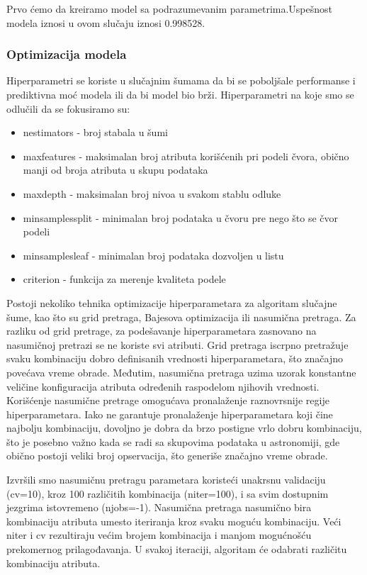 \documentclass[a4paper,12pt]{article}
\begin{document}
Prvo ćemo da kreiramo model sa podrazumevanim parametrima.Uspešnost modela iznosi u ovom slučaju iznosi 0.998528.

\subsubsection{Optimizacija modela}
Hiperparametri se koriste u slučajnim šumama da bi se poboljšale performanse i prediktivna moć modela ili da bi model bio brži.
Hiperparametri na koje smo se odlučili da se fokusiramo su:
\begin{itemize}
    \item n\textunderscore estimators - broj stabala u šumi
    \item max\textunderscore features - maksimalan broj atributa korišćenih pri podeli čvora, obično manji od broja atributa u skupu podataka
    \item max\textunderscore depth - maksimalan broj nivoa u svakom stablu odluke
    \item min\textunderscore samples\textunderscore split - minimalan broj podataka u čvoru pre nego što se čvor podeli
    \item min\textunderscore samples\textunderscore leaf - minimalan broj podataka dozvoljen u listu
    \item criterion - funkcija za merenje kvaliteta podele
\end{itemize}

Postoji nekoliko tehnika optimizacije hiperparametara za algoritam slučajne šume, kao što su grid pretraga, Bajesova optimizacija ili nasumična pretraga. Za razliku od grid pretrage, za podešavanje hiperparametara zasnovano na nasumičnoj pretrazi se ne koriste svi atributi. Grid pretraga iscrpno pretražuje svaku kombinaciju dobro definisanih vrednosti hiperparametara, što značajno povećava vreme obrade. Međutim, nasumična pretraga uzima uzorak konstantne veličine konfiguracija atributa određenih raspodelom njihovih vrednosti. Korišćenje nasumične pretrage omogućava pronalaženje raznovrsnije regije hiperparametara. Iako ne garantuje pronalaženje hiperparametara koji čine najbolju kombinaciju, dovoljno je dobra da brzo postigne vrlo dobru kombinaciju, što je posebno važno kada se radi sa skupovima podataka u astronomiji, gde obično postoji veliki broj opservacija, što generiše značajno vreme obrade.

Izvršili smo nasumičnu pretragu parametara koristeći unakrsnu validaciju (cv=10), kroz 100 različitih kombinacija (n\textunderscore iter=100), i sa svim dostupnim jezgrima istovremeno (n\textunderscore jobs=-1). Nasumična pretraga nasumično bira kombinaciju atributa umesto iteriranja kroz svaku moguću kombinaciju. Veći n\textunderscore iter i cv rezultiraju većim brojem kombinacija i manjom mogućnošću prekomernog prilagođavanja. U svakoj iteraciji, algoritam će odabrati različitu kombinaciju atributa.
\end{document}
